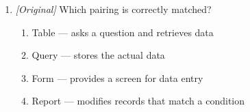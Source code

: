 \begin{enumerate}[label=\textbf{Q\arabic*.}, leftmargin=*]
\begin{enumerate}[label=\Alph*.]
    \item lists the columns to be displayed.
    \item gives the condition that the rows must satisfy.
    \item sorts the result in ascending order.
  \end{enumerate}
\item \textit{[Original]} Which pairing is correctly matched?
  \begin{enumerate}[label=\Alph*.]
    \item Table --- asks a question and retrieves data
    \item Query --- stores the actual data
    \item Form --- provides a screen for data entry
    \item Report --- modifies records that match a condition
  \end{enumerate}


\end{enumerate}
